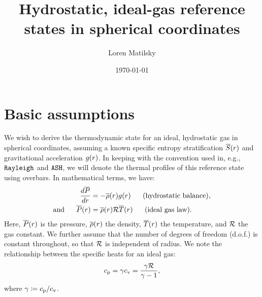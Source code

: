 \documentclass[12pt]{article}
\date{\today}
\author{Loren Matilsky}
\title{Hydrostatic, ideal-gas reference states in spherical coordinates}
\numberwithin{equation}{section}
\begin{document}
	\maketitle
	\section{Basic assumptions}
	We wish to derive the thermodynamic state for an ideal, hydrostatic gas in spherical coordinates, assuming a known specific entropy stratification $\overline{S}(r)$ and gravitational acceleration $g(r)$. In keeping with the convention used in, e.g., $\texttt{Rayleigh}$ and $\texttt{ASH}$, we will denote the thermal profiles of this reference state using overbars. In mathematical terms, we have:
	\begin{align}
	\frac{d\overline{P}}{dr} &= -\overline{\rho}(r) g(r)\ \ \ \ \ \text{(hydrostatic balance)}\label{eq:hydr},\\
	\text{and}\ \ \ \ \  \overline{P}(r) &= \overline{\rho}(r)\mathcal{R} \overline{T}(r)\ \ \ \ \ \text{(ideal gas law)}.\label{eq:idgas}
	\end{align}
	Here, $\overline{P}(r)$ is the pressure, $\overline{\rho}(r)$ the density, $\overline{T}(r)$ the temperature, and $\mathcal{R}$ the gas constant. We further assume that the number of degrees of freedom (d.o.f.) is constant throughout, so that $\mathcal{R}$ is independent of radius. We note the relationship between the specific heats for an ideal gas:
	\begin{align}
	c_{\rm{p}} = \gamma c_{\rm{v}} = \frac{\gamma\mathcal{R}}{\gamma- 1}\label{eq:cp_from_gamma},
	\end{align}
	where $\gamma\coloneqq c_{\rm{p}}/c_{\rm{v}}$. 
	
\end{document}
